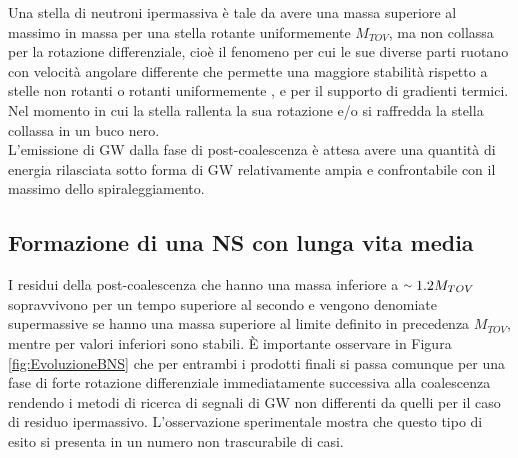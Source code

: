 Una stella di neutroni ipermassiva è tale da avere una massa superiore al massimo in massa per una stella rotante uniformemente $M_{TOV}$, ma non collassa per la rotazione differenziale, cioè il fenomeno per cui le sue diverse parti ruotano con velocità angolare differente che permette una maggiore stabilità rispetto a stelle non rotanti o rotanti uniformemente \cite{Baumgarte_2000}, e per il supporto di gradienti termici.
Nel momento in cui la stella rallenta la sua rotazione e/o si raffredda  la stella collassa in un buco nero. \\
%
L'emissione di GW dalla fase di post-coalescenza è attesa avere una quantità di energia rilasciata sotto forma di GW relativamente ampia e confrontabile con il massimo dello spiraleggiamento\cite{sarin2020evolution}. 

\subsection{Formazione di una NS con lunga vita media}
\label{subsection:long_lived}
I residui della post-coalescenza che hanno una massa inferiore a $\smallsim1.2M_{TOV}$ sopravvivono per un tempo superiore al secondo e vengono denomiate supermassive se hanno una massa superiore al limite definito in precedenza $M_{TOV}$, mentre per valori inferiori sono stabili.
È importante osservare in Figura \ref{fig:EvoluzioneBNS} che per entrambi i prodotti finali si passa comunque per una fase di forte rotazione differenziale immediatamente successiva alla coalescenza rendendo i metodi di ricerca di segnali di GW non differenti da quelli per il caso di residuo ipermassivo.
L'osservazione sperimentale mostra che questo tipo di esito si presenta in un numero non trascurabile di casi.

